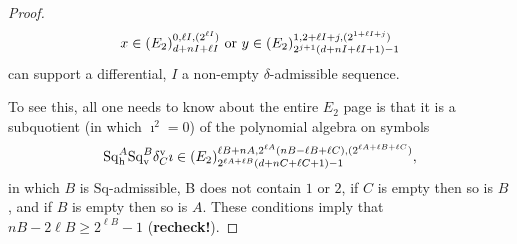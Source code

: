 \documentclass[11pt]{amsart}
\theoremstyle{plain}
\theoremstyle{definition}
\theoremstyle{plain}
\newcommand{\Sq}{\mathrm{Sq}}
\newcommand{\Sqh}{\mathrm{Sq}_\textup{h}}
\newcommand{\Sqv}{\mathrm{Sq}_\textup{v}}
\begin{document}
\begin{Calculations of HW0}
\begin{proof}
%
%
%
\[x\in (E_2)^{0,\ell I,(2^{\ell I})}_{d+nI+\ell I}\textup{ or }y\in (E_2)^{1,2+\ell I+j,(2^{1+\ell I+j})}_{2^{j+1}(d+nI+\ell I+1)-1}\]
can support a differential, $I$ a non-empty $\delta$-admissible sequence.

To see this, all one needs to know about the entire $E_2$ page is that it is a subquotient (in which $\imath^2=0$) of the polynomial algebra on symbols
\[\Sqh^A\Sqv^B\delta_C^\textup{v}\imath\in (E_2)^{\ell B+nA,2^{\ell A}(nB-\ell B+\ell C),(2^{\ell A+\ell B+\ell C})}_{2^{\ell A+\ell B}(d+nC+\ell C+1)-1},\]
in which $B$ is $\Sq$-admissible, B does not contain $1$ or $2$, if $C$ is empty then so is $B$, and if $B$ is empty then so is $A$. These conditions imply that $nB-2\ell B\geq2^{\ell B}-1$ (\textbf{recheck!}). %


\end{proof}
\end{Calculations of HW0}
\end{document}
